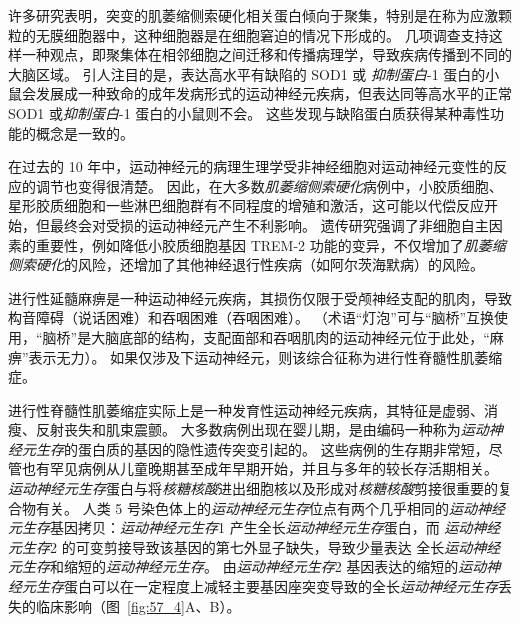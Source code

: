 许多研究表明，突变的肌萎缩侧索硬化相关蛋白倾向于聚集，特别是在称为应激颗粒的无膜细胞器中，这种细胞器是在细胞窘迫的情况下形成的。
几项调查支持这样一种观点，即聚集体在相邻细胞之间迁移和传播病理学，导致疾病传播到不同的大脑区域。
引人注目的是，表达高水平有缺陷的 SOD1 或 \textit{抑制蛋白}-1 蛋白的小鼠会发展成一种致命的成年发病形式的运动神经元疾病，但表达同等高水平的正常 SOD1 或\textit{抑制蛋白}-1 蛋白的小鼠则不会。
这些发现与缺陷蛋白质获得某种毒性功能的概念是一致的。


在过去的 10 年中，运动神经元的病理生理学受非神经细胞对运动神经元变性的反应的调节也变得很清楚。
因此，在大多数\textit{肌萎缩侧索硬化}病例中，小胶质细胞、星形胶质细胞和一些淋巴细胞群有不同程度的增殖和激活，这可能以代偿反应开始，但最终会对受损的运动神经元产生不利影响。
遗传研究强调了非细胞自主因素的重要性，例如降低小胶质细胞基因 TREM-2 功能的变异，不仅增加了\textit{肌萎缩侧索硬化}的风险，还增加了其他神经退行性疾病（如阿尔茨海默病）的风险。


进行性延髓麻痹是一种运动神经元疾病，其损伤仅限于受颅神经支配的肌肉，导致构音障碍（说话困难）和吞咽困难（吞咽困难）。 
（术语“灯泡”可与“脑桥”互换使用，“脑桥”是大脑底部的结构，支配面部和吞咽肌肉的运动神经元位于此处，“麻痹”表示无力）。
如果仅涉及下运动神经元，则该综合征称为进行性脊髓性肌萎缩症。


进行性脊髓性肌萎缩症实际上是一种发育性运动神经元疾病，其特征是虚弱、消瘦、反射丧失和肌束震颤。
大多数病例出现在婴儿期，是由编码一种称为\textit{运动神经元生存}的蛋白质的基因的隐性遗传突变引起的。
这些病例的生存期非常短，尽管也有罕见病例从儿童晚期甚至成年早期开始，并且与多年的较长存活期相关。
\textit{运动神经元生存}蛋白与将\textit{核糖核酸}进出细胞核以及形成对\textit{核糖核酸}剪接很重要的复合物有关。
人类 5 号染色体上的\textit{运动神经元生存}位点有两个几乎相同的\textit{运动神经元生存}基因拷贝：\textit{运动神经元生存}1 产生全长\textit{运动神经元生存}蛋白，而 \textit{运动神经元生存}2 的可变剪接导致该基因的第七外显子缺失，导致少量表达 全长\textit{运动神经元生存}和缩短的\textit{运动神经元生存}。
由\textit{运动神经元生存}2 基因表达的缩短的\textit{运动神经元生存}蛋白可以在一定程度上减轻主要基因座突变导致的全长\textit{运动神经元生存}丢失的临床影响（图~\ref{fig:57_4}A、B）。


